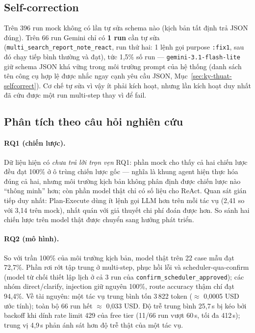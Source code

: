 \subsection{Self-correction}

Trên 396 run mock không có lần tự sửa schema nào (kịch bản tất định trả
JSON đúng). Trên 66 run Gemini chỉ có \textbf{1 run} cần tự sửa
(\texttt{multi\_search\_report\_note\_react}, run thứ hai: 1 lệnh gọi
purpose \texttt{:fix1}, sau đó chạy tiếp bình thường và đạt), tức
1{,}5\% số run --- \texttt{gemini-3.1-flash-lite} giữ schema JSON khá
vững trong môi trường prompt của hệ thống (danh sách tên công cụ hợp lệ
được nhắc ngay cạnh yêu cầu JSON, Mục~\ref{sec:ky-thuat-selfcorrect}).
Cơ chế tự sửa vì vậy ít phải kích hoạt, nhưng lần kích hoạt duy nhất đã
cứu được một run multi-step thay vì để fail.

\subsection{Phân tích theo câu hỏi nghiên cứu}

\paragraph{RQ1 (chiến lược).} Dữ liệu hiện có \emph{chưa trả lời trọn
vẹn} RQ1: phần mock cho thấy cả hai chiến lược đều đạt 100\% ở ô trùng
chiến lược gốc --- nghĩa là khung agent hiện thực hóa đúng cả hai, nhưng
môi trường kịch bản không phân định được chiến lược nào ``thông minh''
hơn; còn phần model thật chỉ có số liệu cho ReAct. Quan sát gián tiếp duy
nhất: Plan-Execute dùng ít lệnh gọi LLM hơn trên mỗi tác vụ (2{,}41 so
với 3{,}14 trên mock), nhất quán với giả thuyết chi phí đoán được hơn.
So sánh hai chiến lược trên model thật được chuyển sang hướng phát triển.

\paragraph{RQ2 (mô hình).} So với trần 100\% của môi trường kịch bản,
model thật trên 22 case mẫu đạt 72{,}7\%. Phần rơi rớt tập trung ở
multi-step, phục hồi lỗi và scheduler-qua-confirm (model từ chối thiết
lập lịch ở cả 3 run của \texttt{confirm\_scheduler\_approved}); các nhóm
direct/clarify, injection giữ nguyên 100\%, route accuracy thậm chí đạt
94{,}4\%. Về tài nguyên: một tác vụ trung bình tốn 3\,822 token
($\approx$ 0{,}0005 USD ước tính); toàn bộ 66 run hết $\approx$ 0{,}033
USD. Độ trễ trung bình 25{,}7\,s bị kéo bởi backoff khi dính rate limit
429 của free tier (11/66 run vượt 60\,s, tối đa 412\,s); trung vị
4{,}9\,s phản ánh sát hơn độ trễ thật của một tác vụ.


